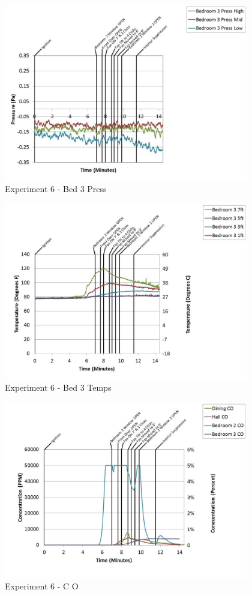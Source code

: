 \documentclass{article}
\begin{document}
\begin{appendices}
	\begin{figure}[h!]
		\centering
		\includegraphics[height=3.05in]{0_Images/Results_Charts/Exp_6_Charts/Bed3Press.pdf}
		\caption{Experiment 6 - Bed 3 Press}
	\end{figure}
 
	\clearpage

	\begin{figure}[h!]
		\centering
		\includegraphics[height=3.05in]{0_Images/Results_Charts/Exp_6_Charts/Bed3Temps.pdf}
		\caption{Experiment 6 - Bed 3 Temps}
	\end{figure}
 

	\begin{figure}[h!]
		\centering
		\includegraphics[height=3.05in]{0_Images/Results_Charts/Exp_6_Charts/CO.pdf}
		\caption{Experiment 6 - C O}
	\end{figure}
 

\end{appendices}
\end{document}
